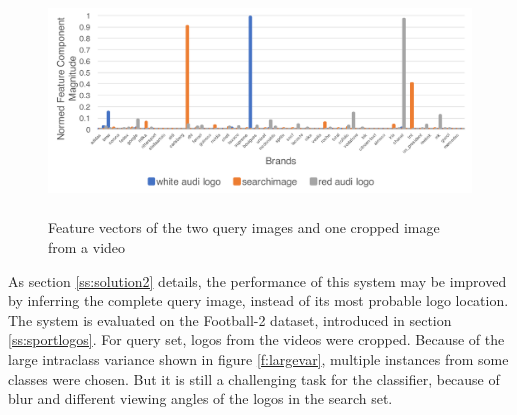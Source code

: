 \begin{figure}
  \centering
  \includegraphics[height=60mm]{images/mt/faster_confusion.pdf}
  \caption{Feature vectors of the two query images and one cropped image from a video}
  \label{f:fasterconfusion}
\end{figure}

As section \ref{ss:solution2} details, the performance of this system may be improved by inferring the complete query image, instead of its most probable logo location. The system is evaluated on the Football-2 dataset, introduced in section \ref{ss:sportlogos}. For query set, logos from the videos were cropped. Because of the large intraclass variance shown in figure \ref{f:largevar}, multiple instances from some classes were chosen. But it is still a challenging task for the classifier, because of blur and different viewing angles of the logos in the search set.

